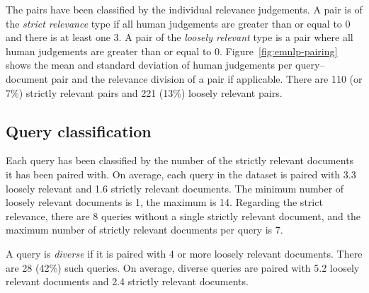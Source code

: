 The pairs have been classified by the individual relevance judgements. A pair is of the \textit{strict relevance} type if all human judgements are greater than or equal to 0 and there is at least one 3. A pair of the \textit{loosely   relevant} type is a pair where all human judgements are greater than or equal to 0. Figure~\ref{fig:emnlp-pairing} shows the mean and standard deviation of human judgements per query--document pair and the relevance division of a pair if applicable. There are 110 (or 7\%) strictly relevant pairs and 221 (13\%) loosely relevant pairs.

\subsection{Query classification}

Each query has been classified by the number of the strictly relevant documents it has been paired with. On average, each query in the dataset is paired with 3.3 loosely relevant and 1.6 strictly relevant documents. The minimum number of loosely relevant documents is 1, the maximum is 14. Regarding the strict relevance, there are 8 queries without a single strictly relevant document, and the maximum number of strictly relevant documents per query is 7.

A query is \textit{diverse} if it is paired with 4 or more loosely relevant documents. There are 28 (42\%) such queries. On average, diverse queries are paired with 5.2 loosely relevant documents and 2.4 strictly relevant documents.

